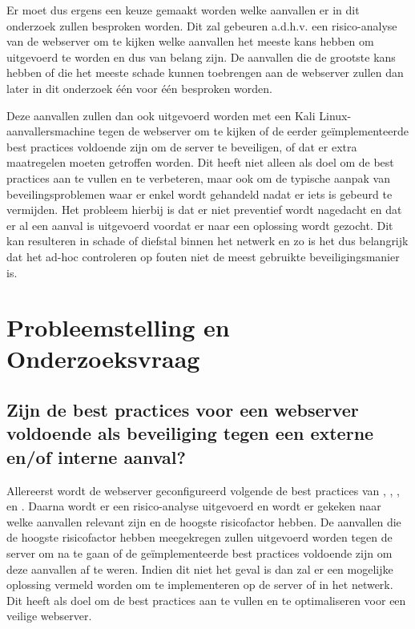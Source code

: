 \documentclass[pdftex,a4paper,12pt]{report}
\begin{document}
Er moet dus ergens een keuze gemaakt worden welke aanvallen er in dit onderzoek zullen besproken worden. Dit zal gebeuren a.d.h.v. een risico-analyse van de webserver om te kijken welke aanvallen het meeste kans hebben om uitgevoerd te worden en dus van belang zijn. De aanvallen die de grootste kans hebben of die het meeste schade kunnen toebrengen aan de webserver zullen dan later in dit onderzoek één voor één besproken worden. \newline 

Deze aanvallen zullen dan ook uitgevoerd worden met een Kali Linux-aanvallersmachine tegen de webserver om te kijken of de eerder geïmplementeerde best practices voldoende zijn om de server te beveiligen, of dat er extra maatregelen moeten getroffen worden. Dit heeft niet alleen als doel om de best practices aan te vullen en te verbeteren, maar ook om de typische aanpak van beveilingsproblemen waar er enkel wordt gehandeld nadat er iets is gebeurd te vermijden. Het probleem hierbij is dat er niet preventief wordt nagedacht en dat er al een aanval is uitgevoerd voordat er naar een oplossing wordt gezocht. Dit kan resulteren in schade of diefstal binnen het netwerk en zo is het dus belangrijk dat het ad-hoc controleren op fouten niet de meest gebruikte beveiligingsmanier is.


\section{Probleemstelling en Onderzoeksvraag}
\label{sec:onderzoeksvragen}

\subsection{Zijn de best practices voor een webserver voldoende als beveiliging tegen een externe en/of interne aanval?}

Allereerst wordt de webserver geconfigureerd volgende de best practices van \cite{Cott2012}, \cite{Microsoft2013}, \cite{Poley2013}, \cite{Posey2011} en \cite{Vialle2012}. Daarna wordt er een risico-analyse uitgevoerd en wordt er gekeken naar welke aanvallen relevant zijn en de hoogste risicofactor hebben. De aanvallen die de hoogste risicofactor hebben meegekregen zullen uitgevoerd worden tegen de server om na te gaan of de geïmplementeerde best practices voldoende zijn om deze aanvallen af te weren. Indien dit niet het geval is dan zal er een mogelijke oplossing vermeld worden om te implementeren op de server of in het netwerk. Dit heeft als doel om de best practices aan te vullen en te optimaliseren voor een veilige webserver.
\end{document}
